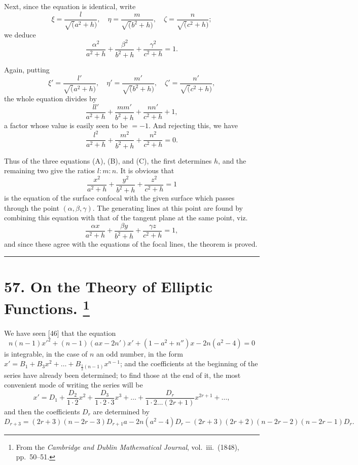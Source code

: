 \documentclass[11pt,a4paper]{book}
\begin{document}
Next, since the equation is identical, write
\[
\xi = \frac{l}{\surd(a^2 + h)}, \quad \eta = \frac{m}{\surd(b^2 + h)}, \quad \zeta = \frac{n}{\surd(c^2 + h)};
\]
we deduce
\[
\frac{\alpha^2}{a^2 + h} + \frac{\beta^2}{b^2 + h} + \frac{\gamma^2}{c^2 + h} = 1.
\]

Again, putting
\[
\xi' = \frac{l'}{\surd(a^2 + h)}, \quad \eta' = \frac{m'}{\surd(b^2 + h)}, \quad \zeta' = \frac{n'}{\surd(c^2 + h)},
\]
the whole equation divides by
\[
\frac{ll'}{a^2 + h} + \frac{mm'}{b^2 + h} + \frac{nn'}{c^2 + h} + 1,
\]
a factor whose value is easily seen to be $= -1$. And rejecting this, we have
\[
\frac{l^2}{a^2 + h} + \frac{m^2}{b^2 + h} + \frac{n^2}{c^2 + h} = 0. \tag{C}
\]

Thus of the three equations (A), (B), and (C), the first determines $h$, and the remaining
two give the ratios $l : m : n$. It is obvious that
\[
\frac{x^2}{a^2 + h} + \frac{y^2}{b^2 + h} + \frac{z^2}{c^2 + h} = 1
\]
is the equation of the surface confocal with the given surface which passes through
the point $(\alpha, \beta, \gamma)$. The generating lines at this point are found by combining this
equation with that of the tangent plane at the same point, viz.
\[
\frac{\alpha x}{a^2 + h} + \frac{\beta y}{b^2 + h} + \frac{\gamma z}{c^2 + h} = 1,
\]
and since these agree with the equations of the focal lines, the theorem is proved.

\bigskip
\hrule
\bigskip

\newpage
\section[On the Theory of Elliptic Functions]{%
57. On the Theory of Elliptic Functions.%
\footnote{From the \textit{Cambridge and Dublin Mathematical Journal}, vol.~iii.\ (1848), pp.~50--51.}}

We have seen [46] that the equation
\[
n(n-1)x'^2 + (n-1)(ax - 2n')x' + (1 - a^2 + n'')x - 2n(a^2 - 4) = 0
\]
is integrable, in the case of $n$ an odd number, in the form
$x' = B_1 + B_3 x^2 + \ldots + B_{\frac{1}{2}(n-1)} x^{n-1}$;
and the coefficients at the beginning of the series have already been determined; to
find those at the end of it, the most convenient mode of writing the series will be
\[
x' = D_1 + \frac{D_2}{1 \cdot 2}x^2 + \frac{D_3}{1 \cdot 2 \cdot 3}x^3 + \ldots
+ \frac{D_r}{1 \cdot 2 \ldots (2r+1)}x^{2r+1} + \ldots,
\]
and then the coefficients $D_r$ are determined by
\[
D_{r+3} = (2r+3)(n - 2r - 3) D_{r+1} a - 2n(a^2 - 4) D_r
- (2r+3)(2r+2)(n - 2r - 2)(n - 2r - 1) D_r.
\]
\end{document}
